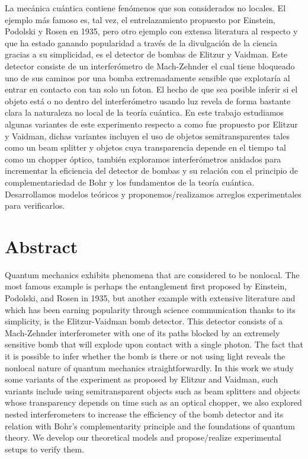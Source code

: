 \documentclass[12pt]{book}
\newcommand\blankpage{
    \null
    \thispagestyle{empty}
    \addtocounter{page}{0}
    \newpage
    }
\begin{document}
La mecánica cuántica contiene fenómenos que son considerados no locales. El ejemplo más famoso es, tal vez, el entrelazamiento propuesto por Einstein, Podolski y Rosen en 1935, pero otro ejemplo con extensa literatura al respecto y que ha estado ganando popularidad a través de la divulgación de la ciencia gracias a su simplicidad, es el detector de bombas de Elitzur y Vaidman. Este detector consiste de un interferómetro de Mach-Zehnder el cual tiene bloqueado uno de sus caminos por una bomba extremadamente sensible que explotaría al entrar en contacto con tan solo un foton. El hecho de que sea posible inferir si el objeto está o no dentro del interferómetro usando luz revela de forma bastante clara la naturaleza no local de la teoría cuántica. En este trabajo estudiamos algunas variantes de este experimento respecto a como fue propuesto por Elitzur y Vaidman, dichas variantes incluyen el uso de objetos semitransparentes tales como un beam splitter y objetos cuya transparencia depende en el tiempo tal como un chopper óptico, también exploramos interferómetros anidados para incrementar la eficiencia del detector de bombas y su relación con el principio de complementariedad de Bohr y los fundamentos de la teoría cuántica. Desarrollamos modelos teóricos y proponemos/realizamos arreglos experimentales para verificarlos.
\thispagestyle{plain}

\pagebreak



\blankpage{}
\chapter*{Abstract}
\thispagestyle{plain}
Quantum mechanics exhibits phenomena that are considered to be nonlocal. The most famous example is perhaps the entanglement first proposed by Einstein, Podolski, and Rosen in 1935, but another example with extensive literature and which has been earning popularity through science communication thanks to its simplicity, is the Elitzur-Vaidman bomb detector. This detector consists of a Mach-Zehnder interferometer with one of its paths blocked by an extremely sensitive bomb that will explode upon contact with a single photon. The fact that it is possible to infer whether the bomb is there or not using light reveals the nonlocal nature of quantum mechanics straightforwardly. In this work we study some variants of the experiment as proposed by Elitzur and Vaidman, such variants include using semitransparent objects such as beam splitters and objects whose transparency depends on time such as an optical chopper, we also explored nested interferometers to increase the efficiency of the bomb detector and its relation with Bohr's complementarity principle and the foundations of quantum theory. We develop our theoretical models and propose/realize experimental setups to verify them. 
\end{document}
